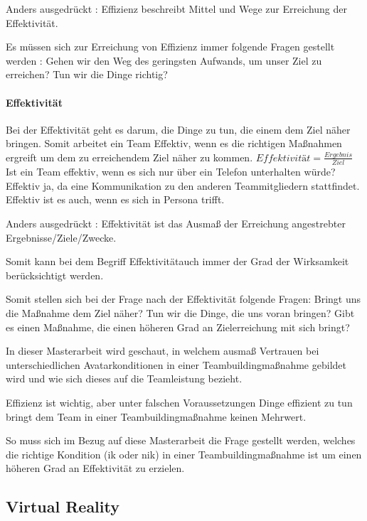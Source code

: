 \documentclass[a4paper,11pt]{article}%
\renewcommand{\\}{\vspace*{0.5\baselineskip} \newline}
\begin{document}
Anders ausgedrückt : Effizienz beschreibt Mittel und Wege zur Erreichung der Effektivität.

Es müssen sich zur Erreichung von Effizienz immer folgende Fragen gestellt werden :
Gehen wir den Weg des geringsten Aufwands, um unser Ziel zu erreichen?
Tun wir die Dinge richtig?

\paragraph{Effektivität}
Bei der Effektivität geht es darum, die Dinge zu tun, die einem dem Ziel näher bringen. 
Somit arbeitet ein Team Effektiv, wenn es die richtigen Maßnahmen ergreift um dem zu erreichendem Ziel näher zu kommen.\\
$Effektivität = \frac{Ergebnis}{Ziel}$ \\
Ist ein Team effektiv, wenn es sich nur über ein Telefon unterhalten würde?
Effektiv ja, da eine Kommunikation zu den anderen Teammitgliedern stattfindet.
Effektiv ist es auch, wenn es sich in Persona trifft.

Anders ausgedrückt : Effektivität ist das Ausmaß der Erreichung angestrebter Ergebnisse/Ziele/Zwecke.

Somit kann bei dem Begriff \flqq Effektivität\frqq auch immer der Grad der Wirksamkeit berücksichtigt werden.

Somit stellen sich bei der Frage nach der Effektivität folgende Fragen: 
Bringt uns die Maßnahme dem Ziel näher? 
Tun wir die Dinge, die uns voran bringen?
Gibt es einen Maßnahme, die einen höheren Grad an Zielerreichung mit sich bringt?

In dieser Masterarbeit wird geschaut, in welchem ausmaß Vertrauen bei unterschiedlichen Avatarkonditionen in einer Teambuildingmaßnahme gebildet wird und wie sich dieses auf die Teamleistung bezieht.

Effizienz ist wichtig, aber unter falschen Voraussetzungen Dinge effizient zu tun bringt dem Team in einer Teambuildingmaßnahme keinen Mehrwert.

So muss sich im Bezug auf diese Masterarbeit die Frage gestellt werden, welches die richtige Kondition (\ac{ik} oder \ac{nik}) in einer Teambuildingmaßnahme ist um einen höheren Grad an Effektivität zu erzielen.

	\subsection{Virtual Reality}
\end{document}
